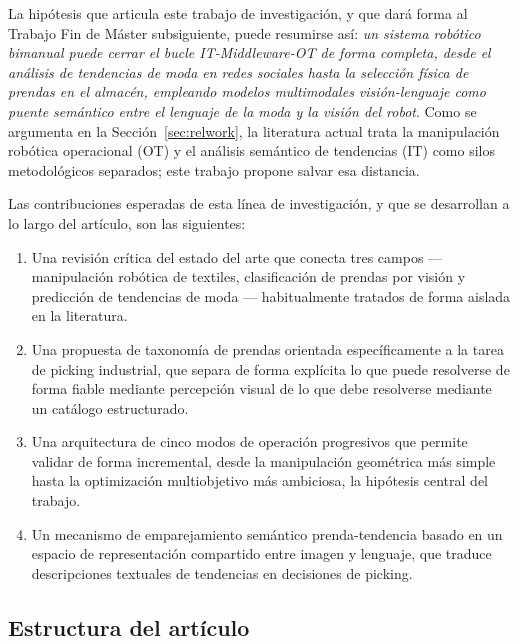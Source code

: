 \documentclass[conference]{IEEEtran}
\begin{document}
La hipótesis que articula este trabajo de investigación, y que dará forma al
Trabajo Fin de Máster subsiguiente, puede resumirse así: \emph{un sistema
robótico bimanual puede cerrar el bucle IT-Middleware-OT de forma completa,
desde el análisis de tendencias de moda en redes sociales hasta la selección
física de prendas en el almacén, empleando modelos multimodales
visión-lenguaje como puente semántico entre el lenguaje de la moda y la
visión del robot}. Como se argumenta en la Sección~\ref{sec:relwork}, la
literatura actual trata la manipulación robótica operacional (OT) y el
análisis semántico de tendencias (IT) como silos metodológicos separados;
este trabajo propone salvar esa distancia.

Las contribuciones esperadas de esta línea de investigación, y que se
desarrollan a lo largo del artículo, son las siguientes:

\begin{enumerate}
\item Una revisión crítica del estado del arte que conecta tres campos ---
manipulación robótica de textiles, clasificación de prendas por visión y
predicción de tendencias de moda --- habitualmente tratados de forma aislada
en la literatura.
\item Una propuesta de taxonomía de prendas orientada específicamente a la
tarea de picking industrial, que separa de forma explícita lo que puede
resolverse de forma fiable mediante percepción visual de lo que debe
resolverse mediante un catálogo estructurado.
\item Una arquitectura de cinco modos de operación progresivos que permite
validar de forma incremental, desde la manipulación geométrica más simple
hasta la optimización multiobjetivo más ambiciosa, la hipótesis central del
trabajo.
\item Un mecanismo de emparejamiento semántico prenda-tendencia basado en un
espacio de representación compartido entre imagen y lenguaje, que traduce
descripciones textuales de tendencias en decisiones de picking.
\end{enumerate}

\subsection{Estructura del artículo}
\end{document}
